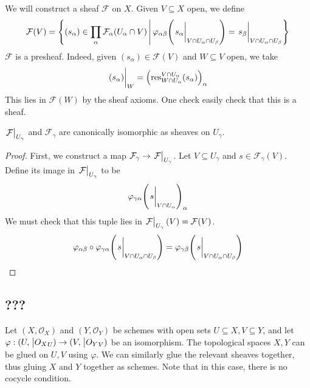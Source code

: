 We will construct a sheaf \( \mathcal F \) on \( X \).
Given \( V \subseteq X \) open, we define
\[ \mathcal F(V) = \qty{(s_\alpha) \in \prod_\alpha \mathcal F_\alpha(U_\alpha \cap V) \midd \varphi_{\alpha\beta}\qty(\eval{s_\alpha}_{V \cap U_\alpha \cap U_\beta}) = \eval{s_\beta}_{V \cap U_\alpha \cap U_\beta}} \]
\( \mathcal F \) is a presheaf.
Indeed, given \( (s_\alpha) \in \mathcal F(V) \) and \( W \subseteq V \) open, we take
\[ \eval{(s_\alpha)}_W = \qty(\res_{W \cap U_\alpha}^{V \cap U_\alpha}(s_\alpha))_\alpha \]
This lies in \( \mathcal F(W) \) by the sheaf axioms.
One check easily check that this is a sheaf.
\begin{proposition}
    \( \eval{\mathcal F}_{U_\gamma} \) and \( \mathcal F_\gamma \) are canonically isomorphic as sheaves on \( U_\gamma \).
\end{proposition}
\begin{proof}
    First, we construct a map \( \mathcal F_\gamma \to \eval{\mathcal F}_{U_\gamma} \).
    Let \( V \subseteq U_\gamma \) and \( s \in \mathcal F_\gamma(V) \).
    Define its image in \( \eval{\mathcal F}_{U_\gamma} \) to be
    \[ \varphi_{\gamma\alpha}\qty(\eval{s}_{V \cap U_\alpha})_\alpha \]
    We must check that this tuple lies in \( \eval{\mathcal F}_{U_\gamma}(V) = \mathcal F(V) \).
    \[ \varphi_{\alpha\beta} \circ \varphi_{\gamma\alpha}\qty(\eval{s}_{V \cap U_\alpha \cap U_\beta}) = \varphi_{\gamma\beta}\qty(\eval{s}_{V \cap U_\alpha \cap U_\beta}) \]
\end{proof}

\subsection{???}
\begin{example}
    Let \( (X, \mathcal O_X) \) and \( (Y, \mathcal O_Y) \) be schemes with open sets \( U \subseteq X, V \subseteq Y \), and let \( \varphi : (U, \mathcal \eval{O_X}_U) \to (V, \mathcal \eval{O_Y}_V) \) be an isomorphism.
    The topological spaces \( X, Y \) can be glued on \( U, V \) using \( \varphi \).
    We can similarly glue the relevant sheaves together, thus gluing \( X \) and \( Y \) together as schemes.
    Note that in this case, there is no cocycle condition.
\end{example}
